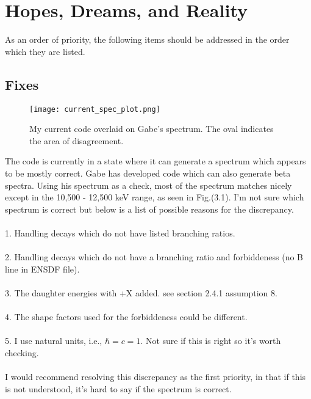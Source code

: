 \documentclass{report}
\begin{document}
 
\chapter{Hopes, Dreams, and Reality}
As an order of priority, the following items should be addressed in the order which they are listed.
\section{Fixes}
\begin{figure}[H]
    \centering
        \texttt{[image: current\_spec\_plot.png]}
        \caption{My current code overlaid on Gabe's spectrum. The oval indicates the area of disagreement.}
\end{figure}

The code is currently in a state where it can generate a spectrum which appears to be mostly correct. Gabe 
has developed code which can also generate beta spectra. Using his spectrum as a check, most of the 
spectrum matches nicely except in the  10,500 - 12,500 keV range, as seen in Fig.(3.1). I'm not sure 
which spectrum is correct but below is a list of possible reasons for the discrepancy. \\ \\ 
1. Handling decays which do not have listed branching ratios. \\ \\
2. Handling decays which do not have a branching ratio and forbiddeness (no B line in ENSDF file).\\ \\
3. The daughter energies with +X added. see section 2.4.1 assumption 8. \\ \\
4. The shape factors used for the forbiddeness could be different.\\ \\
5. I use natural units, i.e., $\hbar = c =1$. Not sure if this is right so it's worth checking. \\ \\
I would recommend resolving this discrepancy as the first priority, in that if this is not understood, it's hard to say if the spectrum is correct.
\end{document}
